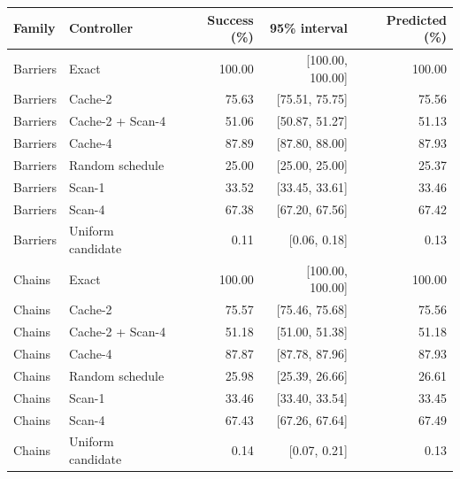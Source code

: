 \begin{tabular}{llrrr}
\toprule
Family & Controller & Success (\%) & 95\% interval & Predicted (\%)\\
\midrule
Barriers & Exact & 100.00 & [100.00, 100.00] & 100.00\\
Barriers & Cache-2 & 75.63 & [75.51, 75.75] & 75.56\\
Barriers & Cache-2 + Scan-4 & 51.06 & [50.87, 51.27] & 51.13\\
Barriers & Cache-4 & 87.89 & [87.80, 88.00] & 87.93\\
Barriers & Random schedule & 25.00 & [25.00, 25.00] & 25.37\\
Barriers & Scan-1 & 33.52 & [33.45, 33.61] & 33.46\\
Barriers & Scan-4 & 67.38 & [67.20, 67.56] & 67.42\\
Barriers & Uniform candidate & 0.11 & [0.06, 0.18] & 0.13\\
Chains & Exact & 100.00 & [100.00, 100.00] & 100.00\\
Chains & Cache-2 & 75.57 & [75.46, 75.68] & 75.56\\
Chains & Cache-2 + Scan-4 & 51.18 & [51.00, 51.38] & 51.18\\
Chains & Cache-4 & 87.87 & [87.78, 87.96] & 87.93\\
Chains & Random schedule & 25.98 & [25.39, 26.66] & 26.61\\
Chains & Scan-1 & 33.46 & [33.40, 33.54] & 33.45\\
Chains & Scan-4 & 67.43 & [67.26, 67.64] & 67.49\\
Chains & Uniform candidate & 0.14 & [0.07, 0.21] & 0.13\\
\bottomrule
\end{tabular}
